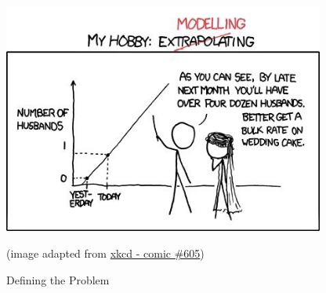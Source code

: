 \begin{topic}
\begin{center}
\begin{minipage}{300pt}
	\includegraphics*[width=300pt]{images/chap1-xkcd.jpg}

	\hfill {\footnotesize (image adapted from \href{https://www.xkcd.com/605/}{xkcd - comic \#605})}
\end{minipage}
\end{center}




\end{topic}






%
%




\begin{module}{Defining the Problem}
	\label{moddefine}

	
	
\end{module}


